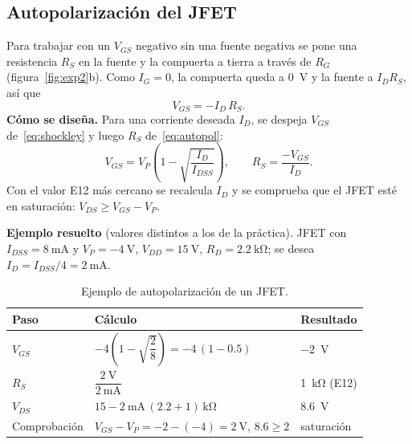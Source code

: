 \documentclass[11pt,a4paper]{article}
\let\needspace\Needspace
\begin{document}
\subsection{Autopolarización del JFET}
Para trabajar con un $V_{GS}$ negativo sin una fuente negativa se pone una resistencia $R_S$
en la fuente y la compuerta a tierra a través de $R_G$ (figura~\ref{fig:exp2}b). Como
$I_G = 0$, la compuerta queda a \qty{0}{\volt} y la fuente a $I_D R_S$, así que
\begin{equation}
  V_{GS} = -I_D\,R_S.
  \label{eq:autopol}
\end{equation}
\noindent\textbf{Cómo se diseña.} Para una corriente deseada $I_D$, se despeja $V_{GS}$
de~\eqref{eq:shockley} y luego $R_S$ de~\eqref{eq:autopol}:
\begin{equation}
  V_{GS} = V_P\left(1 - \sqrt{\frac{I_D}{I_{DSS}}}\right),
  \qquad
  R_S = \frac{-V_{GS}}{I_D}.
  \label{eq:rs}
\end{equation}
Con el valor E12 más cercano se recalcula $I_D$ y se comprueba que el JFET esté en saturación:
$V_{DS} \ge V_{GS} - V_P$.

\needspace{14\baselineskip}
\noindent\textbf{Ejemplo resuelto} (valores distintos a los de la práctica). JFET con
$I_{DSS} = \qty{8}{\milli\ampere}$ y $V_P = \qty{-4}{\volt}$, $V_{DD} = \qty{15}{\volt}$,
$R_D = \qty{2.2}{\kilo\ohm}$; se desea $I_D = I_{DSS}/4 = \qty{2}{\milli\ampere}$.
\begin{table}[H]
  \centering
  \renewcommand{\arraystretch}{2.1}
  \begin{tabularx}{\linewidth}{|>{\centering\arraybackslash}m{2.6cm}|>{\centering\arraybackslash}X|>{\centering\arraybackslash}m{2.8cm}|}
    \hline
    \textbf{Paso} & \textbf{Cálculo} & \textbf{Resultado} \\ \hline
    $V_{GS}$ & $-4\left(1 - \sqrt{\dfrac{2}{8}}\right) = -4\,(1 - \num{0.5})$
             & \qty{-2}{\volt} \\ \hline
    $R_S$ & $\dfrac{\qty{2}{\volt}}{\qty{2}{\milli\ampere}}$ & \qty{1}{\kilo\ohm} (E12) \\ \hline
    $V_{DS}$ & $15 - \qty{2}{\milli\ampere}\,(\num{2.2} + 1)\,\unit{\kilo\ohm}$
             & \qty{8.6}{\volt} \\ \hline
    Comprobación & $V_{GS} - V_P = -2 - (-4) = \qty{2}{\volt}$, \qquad $\num{8.6} \ge 2$
                 & saturación \\ \hline
  \end{tabularx}
  \caption{Ejemplo de autopolarización de un JFET.}
  \label{tab:ejemplo}
\end{table}
\end{document}
